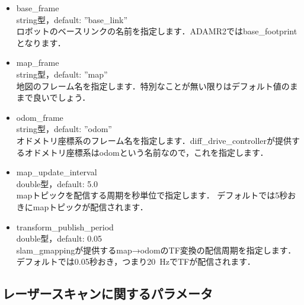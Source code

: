 \documentclass[{../../master}]{subfiles}
\begin{document}
\begin{itemize}
  \item \textsf{base\_frame} \\
    string型，default: \textsf{''base\_link''} \\
    ロボットのベースリンクの名前を指定します．ADAMR2では\textsf{base\_footprint}となります．
  \item \textsf{map\_frame}\\
    string型，default: \textsf{''map''} \\
    地図のフレーム名を指定します．特別なことが無い限りはデフォルト値のままで良いでしょう．
  \item \textsf{odom\_frame}\\
    string型，default: \textsf{''odom''} \\
    オドメトリ座標系のフレーム名を指定します．\textsf{diff\_drive\_controller}が提供するオドメトリ座標系は\textsf{odom}という名前なので，これを指定します．
  \item \textsf{map\_update\_interval}\\
    double型，default: 5.0 \\
    \textsf{map}トピックを配信する周期を秒単位で指定します．
    デフォルトでは5秒おきに\textsf{map}トピックが配信されます．
  \item \textsf{transform\_publish\_period}\\
    double型，default: 0.05 \\
    \textsf{slam\_gmapping}が提供する\textsf{map}→\textsf{odom}のTF変換の配信周期を指定します．
    デフォルトでは0.05秒おき，つまり\SI{20}{Hz}でTFが配信されます．
\end{itemize}

\subsection{レーザースキャンに関するパラメータ}
\end{document}
